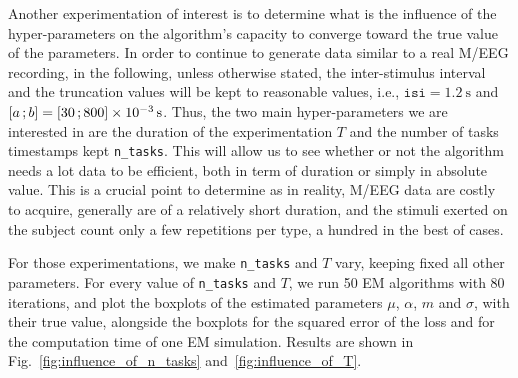 Another experimentation of interest is to determine what is the influence of the hyper-parameters on the algorithm's capacity to converge toward the true value of the parameters.
In order to continue to generate data similar to a real M/EEG recording, in the following, unless otherwise stated, the inter-stimulus interval and the truncation values will be kept to reasonable values, i.e., $\texttt{isi}=\SI{1.2}{\second}$ and $\left[ a \, ; b \right] = \left[ 30 \, ; 800 \right]\times \SI{e-3}{\second}$.
Thus, the two main hyper-parameters we are interested in are the duration of the experimentation $T$ and the number of tasks timestamps kept \texttt{n\_tasks}.
This will allow us to see whether or not the algorithm needs a lot data to be efficient, both in term of duration or simply in absolute value.
This is a crucial point to determine as in reality, M/EEG data are costly to acquire, generally are of a relatively short duration, and the stimuli exerted on the subject count only a few repetitions per type, a hundred in the best of cases.

For those experimentations, we make \texttt{n\_tasks} and $T$ vary, keeping fixed all other parameters.
For every value of \texttt{n\_tasks} and $T$, we run 50 EM algorithms with 80 iterations, and plot the boxplots of the estimated parameters $\mu$, $\alpha$, $m$ and $\sigma$, with their true value, alongside the boxplots for the squared error of the loss and for the computation time of one EM simulation.
Results are shown in Fig.~\ref{fig:influence_of_n_tasks} and~\ref{fig:influence_of_T}.

